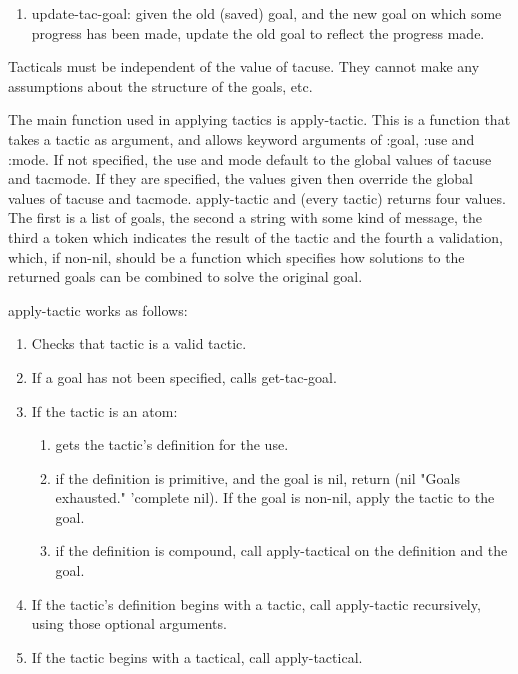 \begin{enumerate}
\begin{enumerate}
\item update-tac-goal: given the old (saved) goal, and the new goal on which
some progress has been made, update the old goal to reflect the
progress made.
\end{enumerate}

Tacticals must be independent of the value of tacuse.  
They cannot make any assumptions
about the structure of the goals, etc.

The main function used in applying tactics is apply-tactic.  This
is a function that takes a tactic as argument, and allows keyword
arguments of :goal, :use and :mode.  If not specified, the use and
mode default to the global values of tacuse and tacmode.
If they are specified,
the values given then override the global values of tacuse and tacmode.
apply-tactic and (every tactic) returns four values.  
 The first is a
list of goals, the second a string with some kind of message, the
third a token which indicates the result of the tactic and the fourth
a validation, which, if non-nil, should be a function which specifies
how solutions to the returned goals can be combined to solve the original goal.

apply-tactic works as follows:

\begin{enumerate}
\item  Checks that tactic is a valid tactic.

\item If a goal has not been specified, calls get-tac-goal.

\item If the tactic is an atom:
  \begin{enumerate}
\item     gets the tactic's definition for the use.

\item     if the definition is primitive, and the goal is nil, return
(nil "Goals exhausted." 'complete nil).  If the goal is non-nil, apply the 
tactic to the goal.

\item     if the definition is compound, call apply-tactical on the
definition and the goal.
  \end{enumerate}

\item  If the tactic's definition begins with a tactic, call apply-tactic
recursively,  using those optional arguments.

\item  If the tactic begins with a tactical, call apply-tactical.
\end{enumerate}


\end{enumerate}
